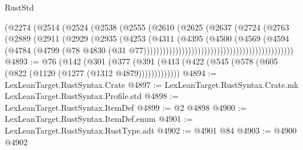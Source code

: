 \begin{lexlean}{RustStd}
\begin{coremodule}
                                                  (@2274
                                                    (@2514
                                                      (@2524
                                                        (@2538
                                                          (@2555
                                                            (@2610
                                                              (@2625
                                                                (@2637
                                                                  (@2724
                                                                    (@2763
                                                                      (@2889
                                                                        (@2911
                                                                          (@2929
                                                                            (@2935
                                                                              (@4253
                                                                                (@4311
                                                                                  (@4395
                                                                                    (@4500
                                                                                      (@4569
                                                                                        (@4594
                                                                                          (@4784
                                                                                            (@4799
                                                                                              (@78
                                                                                                @4830
                                                                                                (@31
                                                                                                  @77)))))))))))))))))))))))))))))))))))))))))))))))
@4893 := @76
    (@142
      (@301 (@377 (@391 (@413 (@422 (@545 (@578 (@605 (@822 (@1120 (@1277 (@1312 @4879)))))))))))))
@4894 := LexLeanTarget.RustSyntax.Crate
@4897 := LexLeanTarget.RustSyntax.Crate.mk LexLeanTarget.RustSyntax.Profile.std
@4898 := LexLeanTarget.RustSyntax.ItemDef
@4899 := @2 @4898
@4900 := LexLeanTarget.RustSyntax.ItemDef.enum
@4901 := LexLeanTarget.RustSyntax.RustType.adt
@4902 := @4901 @84
@4903 := @4900 @4902

\end{coremodule}
\end{lexlean}

